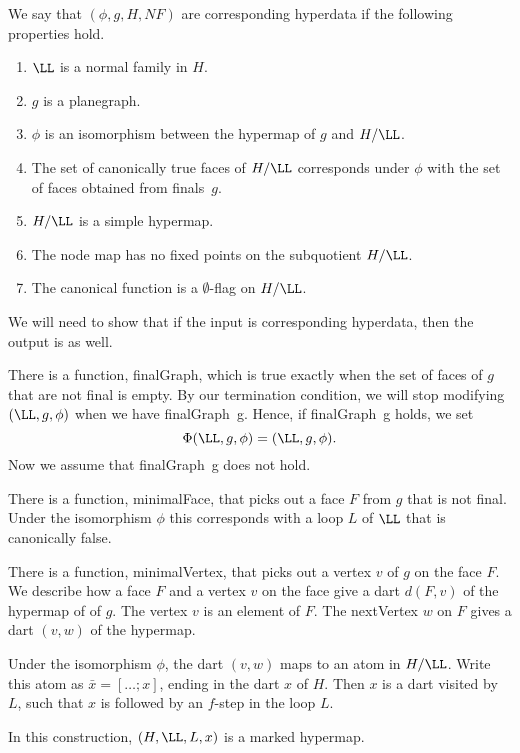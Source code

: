 We say that $(\phi,g,H,NF)$ are corresponding hyperdata if
the following properties hold.
\begin{enumerate}
\item $\LL$ is a normal family in $H$.
\item $g$ is a planegraph.
\item $\phi$ is an isomorphism between the hypermap of $g$  and
$H/\LL$.  
\item  The set of canonically true faces of $H/\LL$
corresponds under $\phi$ with the set of faces obtained from 
finals~$g$.  
\item  $H/\LL$ is a simple hypermap.
\item The node map has no fixed points on the subquotient $H/\LL$.
\item The canonical function is a $\emptyset$-flag on $H/\LL$.
\end{enumerate}

We will need to show that if the input is corresponding hyperdata, then
the output is as well.

There is a function, finalGraph, which is true exactly when
the set of faces of $g$ that are not final is empty.  By our
termination condition, we will stop modifying $(\LL,g,\phi)$
when we have finalGraph~g.  Hence, if finalGraph~g holds, we
set
\[
\Phi(\LL,g,\phi) = (\LL,g,\phi).
\]
Now we assume that finalGraph~g does not hold.

There is a function, minimalFace, that picks out a face $F$ from 
$g$ that is not final.  Under the isomorphism $\phi$ this
corresponds with a loop $L$ of $\LL$ that is canonically false.

There is a function, minimalVertex, that picks out a vertex $v$
of $g$ on the face $F$.  We describe how a face $F$ and a vertex $v$
on the face give a dart $d(F,v)$ of the hypermap of of $g$.
The vertex $v$ is an element of $F$.  The nextVertex $w$ on $F$
gives a dart $(v,w)$ of the hypermap.

Under the isomorphism $\phi$, the dart $(v,w)$ maps to an
atom in $H/\LL$.
Write this atom as $\bar x = [\ldots;x]$, ending in the dart $x$ of $H$.
Then $x$ is a dart visited by $L$, such that $x$ is
followed by an $f$-step in the loop $L$.

\begin{lemma}
In this construction, $(H,\LL,L,x)$ is a marked hypermap.
\end{lemma} 

